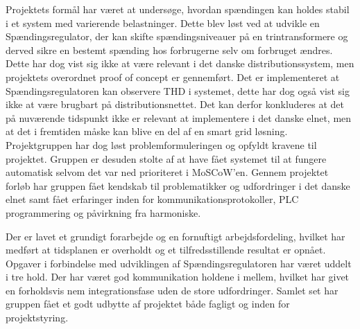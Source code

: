 

Projektets formål har været at undersøge, hvordan spændingen kan holdes stabil i et system med varierende belastninger. Dette blev løst ved at udvikle en Spændingsregulator, der kan skifte spændingsniveauer på en trintransformere og derved sikre en bestemt spænding hos forbrugerne selv om forbruget ændres. Dette har dog vist sig ikke at være relevant i det danske distributionssystem, men projektets overordnet proof of concept er gennemført. Det er implementeret at Spændingsregulatoren kan observere THD i systemet, dette har dog også vist sig ikke at være brugbart på distributionsnettet. Det kan derfor konkluderes at det på nuværende tidspunkt ikke er relevant at implementere i det danske elnet, men at det i fremtiden måske kan blive en del af en smart grid løsning. Projektgruppen har dog løst problemformuleringen og opfyldt kravene til projektet. Gruppen er desuden stolte af at have fået systemet til at fungere automatisk selvom det var ned prioriteret i MoSCoW'en. Gennem projektet forløb har gruppen fået kendskab til problematikker og udfordringer i det danske elnet samt fået erfaringer inden for kommunikationsprotokoller, PLC programmering og påvirkning fra harmoniske.  


Der er lavet et grundigt forarbejde og en fornuftigt arbejdsfordeling, hvilket har medført at tidsplanen er overholdt og et tilfredsstillende resultat er opnået. Opgaver i forbindelse med udviklingen af Spændingsregulatoren har været uddelt i tre hold. Der har været god kommunikation holdene i mellem, hvilket har givet en forholdsvis nem integrationsfase uden de store udfordringer. Samlet set har gruppen fået et godt udbytte af projektet både fagligt og inden for projektstyring.



 